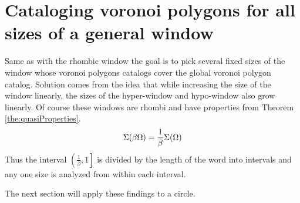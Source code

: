 \documentclass[text.tex]{subfiles}
\begin{document}
\section{Cataloging voronoi polygons for all sizes of a general window}
Same as with the rhombic window the goal is to pick several fixed sizes of the window whose voronoi polygons catalogs cover the global voronoi polygon catalog. Solution comes from the idea that while increasing the size of the window linearly, the sizes of the hyper-window and hypo-window also grow linearly. Of course these windows are rhombi and have properties from Theorem \ref{the:quasiProperties}.
$$\Sigma(\beta\Omega) = \frac{1}{\beta}\Sigma(\Omega) $$
Thus the interval $\left(\frac{1}{\beta},1\right]$ is divided by the length of the word into intervals and any one size is analyzed from within each interval. 

The next section will apply these findings to a circle. 
\end{document}
